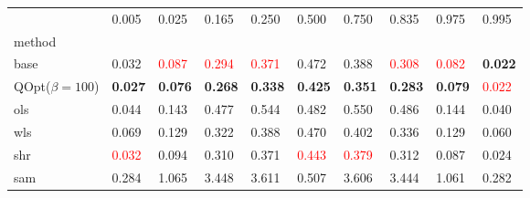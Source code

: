 \begin{tabular}{llllllllll}
\toprule
 & 0.005 & 0.025 & 0.165 & 0.250 & 0.500 & 0.750 & 0.835 & 0.975 & 0.995 \\
method &  &  &  &  &  &  &  &  &  \\
\midrule
base & 0.032 & \textcolor{red}{0.087} & \textcolor{red}{0.294} & \textcolor{red}{0.371} & 0.472 & 0.388 & \textcolor{red}{0.308} & \textcolor{red}{0.082} & \textbf{0.022} \\
\midrule
QOpt($\beta=100$) & \textbf{0.027} & \textbf{0.076} & \textbf{0.268} & \textbf{0.338} & \textbf{0.425} & \textbf{0.351} & \textbf{0.283} & \textbf{0.079} & \textcolor{red}{0.022} \\
ols & 0.044 & 0.143 & 0.477 & 0.544 & 0.482 & 0.550 & 0.486 & 0.144 & 0.040 \\
wls & 0.069 & 0.129 & 0.322 & 0.388 & 0.470 & 0.402 & 0.336 & 0.129 & 0.060 \\
shr & \textcolor{red}{0.032} & 0.094 & 0.310 & 0.371 & \textcolor{red}{0.443} & \textcolor{red}{0.379} & 0.312 & 0.087 & 0.024 \\
sam & 0.284 & 1.065 & 3.448 & 3.611 & 0.507 & 3.606 & 3.444 & 1.061 & 0.282 \\
\bottomrule
\end{tabular}